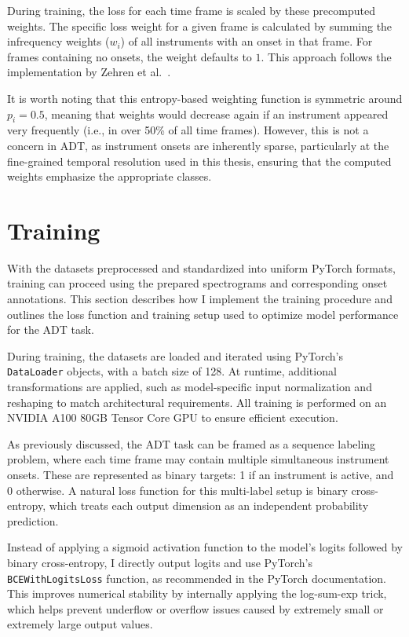During training, the loss for each time frame is scaled by these precomputed weights. The specific loss weight for a given frame is calculated by summing the infrequency weights ($w_i$) of all instruments with an onset in that frame. For frames containing no onsets, the weight defaults to $1$. This approach follows the implementation by Zehren et al.~\cite{signals4040042}.

It is worth noting that this entropy-based weighting function is symmetric around $p_i = 0.5$, meaning that weights would decrease again if an instrument appeared very frequently (i.e., in over 50\% of all time frames). However, this is not a concern in \gls{ADT}, as instrument onsets are inherently sparse, particularly at the fine-grained temporal resolution used in this thesis, ensuring that the computed weights emphasize the appropriate classes.

\section{Training}

With the datasets preprocessed and standardized into uniform PyTorch formats, training can proceed using the prepared spectrograms and corresponding onset annotations. This section describes how I implement the training procedure and outlines the loss function and training setup used to optimize model performance for the \gls{ADT} task.

During training, the datasets are loaded and iterated using PyTorch's \texttt{DataLoader} objects, with a batch size of 128. At runtime, additional transformations are applied, such as model-specific input normalization and reshaping to match architectural requirements. All training is performed on an NVIDIA A100 80GB Tensor Core GPU to ensure efficient execution.

As previously discussed, the \gls{ADT} task can be framed as a sequence labeling problem, where each time frame may contain multiple simultaneous instrument onsets. These are represented as binary targets: 1 if an instrument is active, and 0 otherwise. A natural loss function for this multi-label setup is binary cross-entropy, which treats each output dimension as an independent probability prediction. 

Instead of applying a sigmoid activation function to the model's logits followed by binary cross-entropy, I directly output logits and use PyTorch's \texttt{BCEWithLogitsLoss} function, as recommended in the PyTorch documentation. This improves numerical stability by internally applying the log-sum-exp trick, which helps prevent underflow or overflow issues caused by extremely small or extremely large output values.

